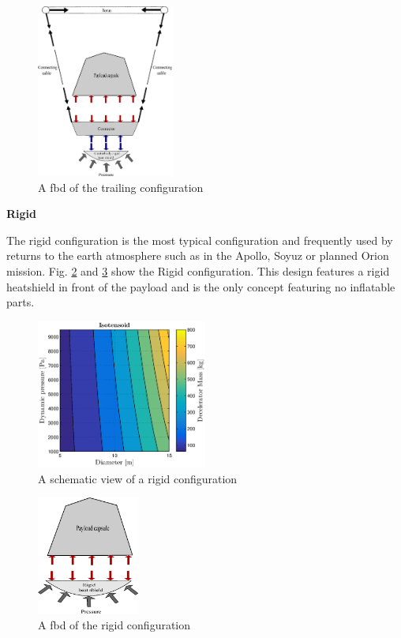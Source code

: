\begin{figure}[H]
\centering
\includegraphics[width = 0.4\textwidth]{Figure/FBD_trailing.eps}
\caption{A \gls{fbd} of the trailing configuration}
\label{fig:fbd_trailing}
\end{figure}

\textbf{Rigid}

The rigid configuration is the most typical configuration and frequently used by returns to the earth atmosphere such as in the Apollo, Soyuz or planned Orion mission. Fig. \ref{fig:conc_rigid} and \ref{fig:fbd_rigid} show the Rigid configuration. This design features a rigid heatshield in front of the payload and is the only concept featuring no inflatable parts.

\begin{figure}[H]
\centering
\includegraphics[width = 0.5\textwidth]{Figure/ISO_comp.eps}
\caption{A schematic view of a rigid configuration}
\label{fig:conc_rigid}
\end{figure}

\begin{figure}[H]
\centering
\includegraphics[width = 0.3\textwidth]{Figure/FBD_rigid.eps}
\caption{A \gls{fbd} of the rigid configuration}
\label{fig:fbd_rigid}
\end{figure}


